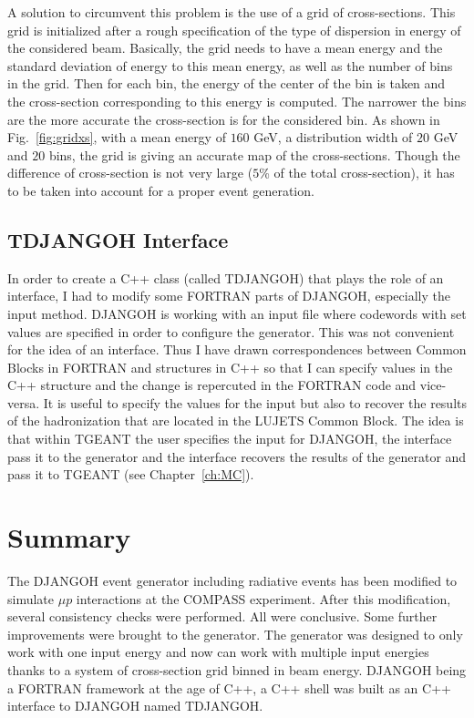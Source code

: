 A solution to circumvent this problem is the use of a grid of cross-sections. This grid is initialized after a rough specification of the type of dispersion in energy of the considered beam. Basically, the grid needs to have a mean energy and the standard deviation of energy to this mean energy, as well as the number of bins in the grid. Then for each bin, the energy of the center of the bin is taken and the cross-section corresponding to this energy is computed. The narrower the bins are the more accurate the cross-section is for the considered bin. As shown in Fig.~\ref{fig:gridxs}, with a mean energy of $160$ GeV, a distribution width of $20$ GeV and $20$ bins, the grid is giving an accurate map of the cross-sections. Though the difference of cross-section is not very large ($5$\% of the total cross-section), it has to be taken into account for a proper event generation.

\subsection{TDJANGOH Interface}

In order to create a C++ class (called TDJANGOH) that plays the role of an interface, I had to modify some FORTRAN parts of DJANGOH, especially the input method. DJANGOH is working with an input file where codewords with set values are specified in order to configure the generator. This was not convenient for the idea of an interface. Thus I have drawn correspondences between Common Blocks in FORTRAN and structures in C++ so that I can specify values in the C++ structure and the change is repercuted in the FORTRAN code and vice-versa. It is useful to specify the values for the input but also to recover the results of the hadronization that are located in the LUJETS Common Block. The idea is that within TGEANT the user specifies the input for DJANGOH, the interface pass it to the generator and the interface recovers the results of the generator and pass it to TGEANT (see Chapter~\ref{ch:MC}).


\section{Summary}

The DJANGOH event generator including radiative events has been modified to simulate $\mu p$ interactions at the COMPASS experiment. After this modification, several consistency checks were performed. All were conclusive. Some further improvements were brought to the generator. The generator was designed to only work with one input energy and now can work with multiple input energies thanks to a system of cross-section grid binned in beam energy. DJANGOH being a FORTRAN framework at the age of C++, a C++ shell was built as an C++ interface to DJANGOH named TDJANGOH.
